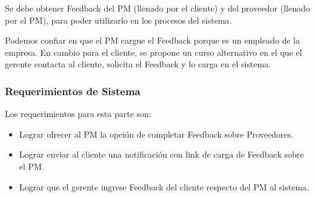 Se debe obtener Feedback del PM (llenado por el cliente) y del proveedor (llenado por el PM), para poder utilizarlo en los procesos del sistema.

Podemos confiar en que el PM cargue el Feedback porque es un empleado de la empresa.
En cambio para el cliente, se propone un curso alternativo en el que el gerente contacta al cliente, solicita el Feedback y lo carga en el sistema.

\subsubsection{Requerimientos de Sistema}
Los requerimientos para esta parte son:
\begin{itemize}
	\item Lograr ofrecer al PM la opción de completar Feedback sobre Proveedores.
	\item Lograr enviar al cliente una notificación con link de carga de Feedback sobre el PM.
	\item Lograr que el gerente ingrese Feedback del cliente respecto del PM al sistema.
\end{itemize}
